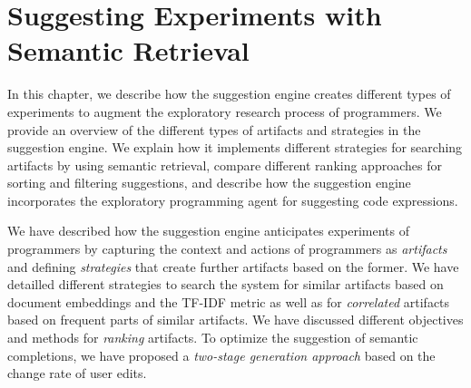 
\chapter{Suggesting Experiments with Semantic Retrieval}
\label{cha:suggestions}

In this chapter, we describe how the suggestion engine creates different types of experiments to augment the exploratory research process of programmers.
We provide an overview of the different types of artifacts and strategies in the suggestion engine.
We explain how it implements different strategies for searching artifacts by using semantic retrieval, compare different ranking approaches for sorting and filtering suggestions, and describe how the suggestion engine incorporates the exploratory programming agent for suggesting code expressions.


\begin{summary}
	We have described how the suggestion engine anticipates experiments of programmers by capturing the context and actions of programmers as \emph{artifacts} and defining \emph{strategies} that create further artifacts based on the former.
	We have detailled different strategies to search the system for similar artifacts based on document embeddings and the TF-IDF metric as well as for \emph{correlated} artifacts based on frequent parts of similar artifacts.
	We have discussed different objectives and methods for \emph{ranking} artifacts.
	To optimize the suggestion of semantic completions, we have proposed a \emph{two-stage generation approach} based on the change rate of user edits.
\end{summary}

